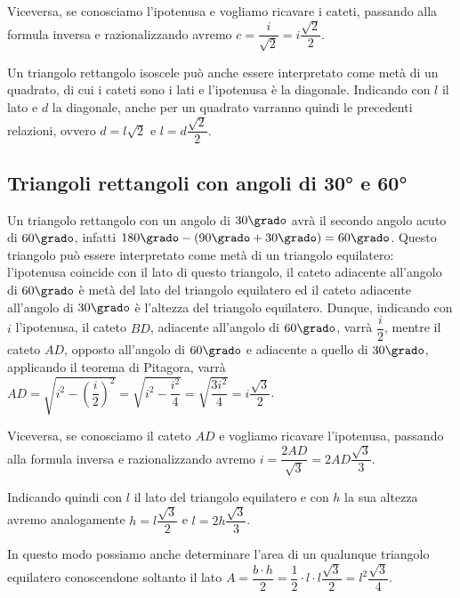 Viceversa, se conosciamo l'ipotenusa e vogliamo ricavare i cateti, 
passando alla formula inversa e razionalizzando avremo 
\(c=\dfrac{i}{\sqrt{2}}=i\dfrac{\sqrt{2}}{2}\).

Un triangolo rettangolo isoscele può anche essere interpretato come 
metà di un quadrato, di cui i cateti sono i lati e l'ipotenusa è la 
diagonale.
Indicando con \(l\) il lato e \(d\) la diagonale, anche per un quadrato 
varranno quindi le precedenti relazioni, ovvero \(d=l\sqrt{2}\) e 
\(l=d\dfrac{\sqrt{2}}{2}\).

\subsection{Triangoli rettangoli con angoli di 30° e 60°}

\begin{wrapfigure}{r}{0.25\textwidth}
	\centering
\end{wrapfigure}
Un triangolo rettangolo con un angolo di \(30\grado\) avrà il secondo 
angolo acuto di \(60\grado\), infatti \(180\grado- 
(90\grado+30\grado)=60\grado\). Questo triangolo può essere 
interpretato come metà di un triangolo equilatero: l'ipotenusa 
coincide con il lato di questo triangolo, il cateto adiacente 
all'angolo di \(60\grado\) è metà del lato del triangolo equilatero ed 
il cateto adiacente all'angolo di \(30\grado\) è l'altezza del 
triangolo equilatero.
Dunque, indicando con \(i\) l'ipotenusa, il cateto \(BD\), adiacente 
all'angolo di \(60\grado\), varrà \(\dfrac{i}{2}\), mentre il cateto 
\(AD\), opposto all'angolo di \(60\grado\) e adiacente a quello di 
\(30\grado\), applicando il teorema di Pitagora, varrà 
\(AD=\sqrt{i^2-\left(\dfrac{i}{2}\right)^2}=\sqrt{i^2-\dfrac{i^2}{4}}
=\sqrt{\dfrac{3i^2}{4}}=i\dfrac{\sqrt{3}}{2}\).

Viceversa, se conosciamo il cateto \(AD\) e vogliamo ricavare 
l'ipotenusa, passando alla formula inversa e razionalizzando avremo 
\(i=\dfrac{2AD}{\sqrt{3}}=2AD\dfrac{\sqrt{3}}{3}\).

Indicando quindi con \(l\) il lato del triangolo equilatero e con \(h\) 
la sua altezza avremo analogamente \(h=l\dfrac{\sqrt{3}}{2}\) e 
\(l=2h\dfrac{\sqrt{3}}{3}\).

In questo modo possiamo anche determinare l'area di un qualunque 
triangolo equilatero conoscendone soltanto il lato \(A=\dfrac{b\cdot 
h}{2}=\dfrac{1}{2}\cdot l\cdot 
l\dfrac{\sqrt{3}}{2}=l^2\dfrac{\sqrt{3}}{4}\).

